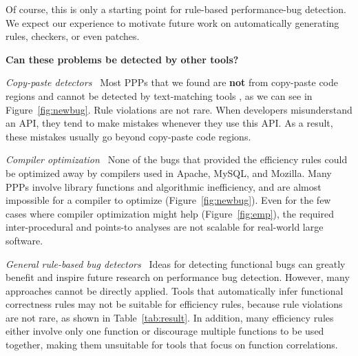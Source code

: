 Of course, this is only a starting point for rule-based performance-bug
detection. We expect our experience to motivate future work on 
automatically generating rules, checkers, or even patches.


\vspace{0.1in}
{\bf Can these problems be detected by other tools?\ }

{\it Copy-paste detectors\ } 
Most PPPs that we found are {\bf not} from copy-paste code regions
 and cannot be detected by text-matching tools
\citep{zhendong.oopsla10,CPMiner04}, as we can see in
Figure~\ref{fig:newbug}. Rule violations are not rare.
When developers misunderstand an API,
they tend to make mistakes whenever they use this API.
As a result, these mistakes usually go beyond
copy-paste code regions.

{\it Compiler optimization\ }
None of the bugs that provided the efficiency rules could be optimized
away by compilers used in Apache, MySQL, and Mozilla. Many PPPs 
involve library functions and algorithmic inefficiency, and
are almost impossible for a compiler to optimize
(Figure~\ref{fig:newbug}).
Even for the few cases where compiler optimization might help
(Figure~\ref{fig:emp}), 
the required inter-procedural and points-to analyses are not scalable
for real-world large software. 

{\it General rule-based bug detectors\ }
Ideas for detecting functional bugs can greatly benefit 
and inspire future research on performance bug detection.
However, many approaches cannot be directly applied.
Tools that automatically infer functional correctness rules 
\citep{engler01bugs,PRMiner05,livshits05dynamine} may not be suitable
for efficiency rules, because rule violations are not rare,
as shown in Table~\ref{tab:result}. In addition, many efficiency rules either
involve only one function or discourage multiple functions to be used together, 
making them unsuitable for tools that focus on function correlations. 






